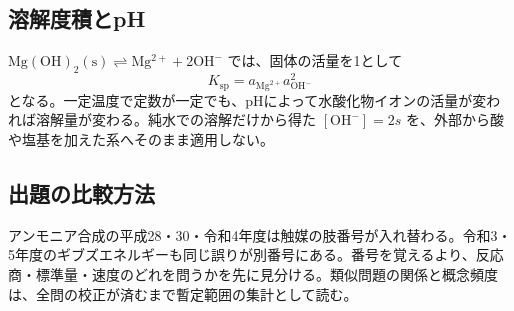 \subsection{溶解度積とpH}
\label{theory:chem_eq:solubility}
\(\mathrm{Mg(OH)_2(s)\rightleftharpoons Mg^{2+}+2OH^-}\) では、固体の活量を1として
\[
K_{\mathrm{sp}}=a_{\mathrm{Mg^{2+}}}a_{\mathrm{OH^-}}^2
\]
となる。一定温度で定数が一定でも、pHによって水酸化物イオンの活量が変われば溶解量が変わる。純水での溶解だけから得た \([\mathrm{OH^-}]=2s\) を、外部から酸や塩基を加えた系へそのまま適用しない。

\subsection{出題の比較方法}
アンモニア合成の平成28・30・令和4年度は触媒の肢番号が入れ替わる。令和3・5年度のギブズエネルギーも同じ誤りが別番号にある。番号を覚えるより、反応商・標準量・速度のどれを問うかを先に見分ける。類似問題の関係と概念頻度は、全問の校正が済むまで暫定範囲の集計として読む。
